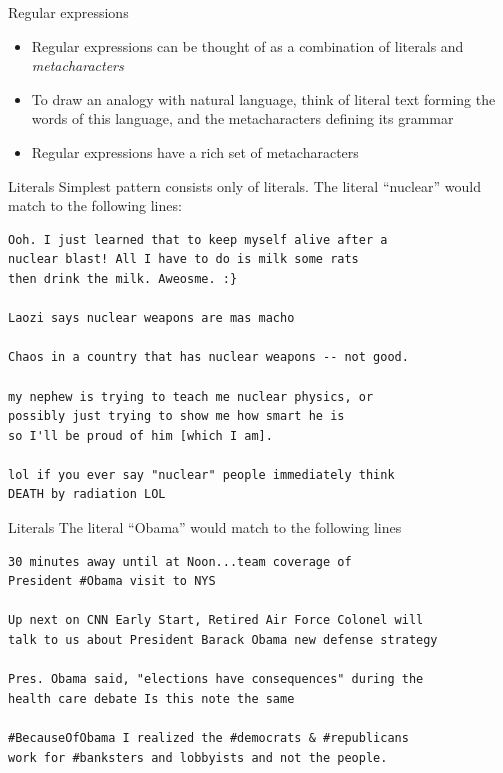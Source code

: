 \documentclass{beamer}
\begin{document}
\begin{frame}{Regular expressions}
\begin{itemize}
\item
Regular expressions can be thought of as a combination of literals and
\textit{metacharacters}
\item
To draw an analogy with natural language, think of literal text
forming the words of this language, and the metacharacters defining
its grammar
\item
Regular expressions have a rich set of metacharacters
\end{itemize}

\end{frame}

\begin{frame}[fragile]{Literals}
Simplest pattern consists only of literals.  The literal ``nuclear''
would match to the following lines:
\begin{verbatim}
Ooh. I just learned that to keep myself alive after a 
nuclear blast! All I have to do is milk some rats 
then drink the milk. Aweosme. :}

Laozi says nuclear weapons are mas macho

Chaos in a country that has nuclear weapons -- not good.

my nephew is trying to teach me nuclear physics, or 
possibly just trying to show me how smart he is 
so I'll be proud of him [which I am].

lol if you ever say "nuclear" people immediately think 
DEATH by radiation LOL
\end{verbatim}
\end{frame}

\begin{frame}[fragile]{Literals}
The literal ``Obama'' would match to the following lines
\begin{verbatim}
30 minutes away until at Noon...team coverage of 
President #Obama visit to NYS

Up next on CNN Early Start, Retired Air Force Colonel will 
talk to us about President Barack Obama new defense strategy

Pres. Obama said, "elections have consequences" during the 
health care debate Is this note the same

#BecauseOfObama I realized the #democrats & #republicans 
work for #banksters and lobbyists and not the people.
\end{verbatim}
\end{frame}
\end{document}
